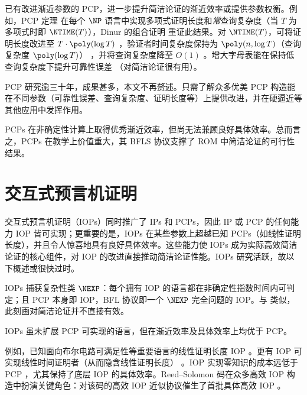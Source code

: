 \documentclass[american,singlepageview]{snargs-book-zh}
\begin{document}
已有改进渐近参数的 PCP，进一步提升简洁论证的渐近效率或提供参数权衡。例如，PCP 定理 \cite{AroraS98,AroraLMSS98} 在每个 $\NP$ 语言中实现多项式证明长度和\emph{常}查询复杂度（当 $T$ 为多项式时即 $\NTIME(T)$），Dinur 的组合证明 \cite{Dinur07} 重证此结果。对 $\NTIME(T)$，可将证明长度改进至 $T\cdot\poly(\log T)$ \cite{BenSassonS08}，验证者时间复杂度保持为 $\poly(n,\log T)$（查询复杂度 $\poly(\log T)$） \cite{BenSassonGHSV05}，并将查询复杂度降至 $O(1)$ \cite{Dinur07,Mie09}。增大字母表能在保持低查询复杂度下提升可靠性误差 \cite{RazS97,AroraS03,DinurFKRS11,DinurHK15}（对简洁论证很有用）。

PCP 研究逾三十年，成果甚多，本文不再赘述。只需了解众多优美 PCP 构造能在不同参数（可靠性误差、查询复杂度、证明长度等）上提供改进，并在硬逼近等其他应用中发挥作用。

PCPs 在非确定性计算上取得优秀渐近效率，但尚无法兼顾良好具体效率。总而言之，PCPs 在教学上价值重大，其 BFLS 协议支撑了 ROM 中简洁论证的可行性结果。

\section{交互式预言机证明}
\label{section:known-iops}

交互式预言机证明（IOPs）同时推广了 IPs 和 PCPs，因此 IP 或 PCP 的任何能力 IOP 皆可实现；更重要的是，IOPs 在某些参数上超越已知 PCPs（如线性证明长度），并且令人惊喜地具有良好具体效率。这些能力使 IOPs 成为实际高效简洁论证的核心组件，对 IOP 的改进直接推动简洁论证性能。IOPs 研究活跃，故以下概述或很快过时。

IOPs 捕获复杂性类 $\NEXP$：每个拥有 IOP 的语言都在非确定性指数时间内可判定；且 PCP 本身即 IOP，BFL 协议即一个 $\NEXP$ 完全问题的 IOP。与  类似，此刻画对简洁论证并不直接有效。

IOPs 虽未扩展 PCP 可实现的语言，但在渐近效率及具体效率上均优于 PCP。

例如，已知面向布尔电路可满足性等重要语言的线性证明长度 IOP \cite{BenSassonCGRS17,RonZewiR20,CascudoG22}。更有 IOP 可实现线性时间证明者（从而隐含线性证明长度） \cite{BootleCGGHJ17,BootleCG20,BootleCL22,RonZewiR22,GolovnevSTW23}。IOP 实现零知识的成本远低于 PCP \cite{BenSassonCGV16,BenSassonCFGRS17}，尤其保持了底层 IOP 的具体效率。Reed--Solomon 码在众多高效 IOP 构造中扮演关键角色：对该码的高效 IOP 近似协议催生了首批具体高效 IOP \cite{BenSassonBHR18-fri,BenSassonBHR18-sci,BenSassonCRSVW19,ChiesaOS20,ArnonCFY24}。
\end{document}
